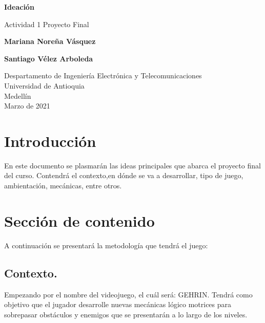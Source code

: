 \documentclass{article}
\begin{document}
\begin{titlepage}
    \begin{center}
        \vspace*{1cm}
            
        \Huge
        \textbf{Ideación}
            
        \vspace{0.5cm}
        \LARGE
        Actividad 1 Proyecto Final
            
        \vspace{1.5cm}
            
        \textbf{Mariana Noreña Vásquez}
        
        \textbf{Santiago Vélez Arboleda}
        
            
        \vfill
            
        \vspace{0.8cm}
            
        \Large
        Despartamento de Ingeniería Electrónica y Telecomunicaciones\\
        Universidad de Antioquia\\
        Medellín\\
        Marzo de 2021
            
    \end{center}
\end{titlepage}

\tableofcontents
\newpage
\section{Introducción}\label{intro}
En este documento se plasmarán las ideas principales que abarca el proyecto final del curso. Contendrá el contexto,en dónde se va a desarrollar, tipo de juego, ambientación, mecánicas, entre otros.  

\section{Sección de contenido} \label{contenido}
A continuación se presentará la metodología que tendrá el juego:
\subsection{Contexto.}
Empezando por el nombre del videojuego, el cuál será: GEHRIN. Tendrá como objetivo que el jugador desarrolle nuevas mecánicas lógico motrices para sobrepasar obstáculos y enemigos que se presentarán a lo largo de los niveles.  
\end{document}
